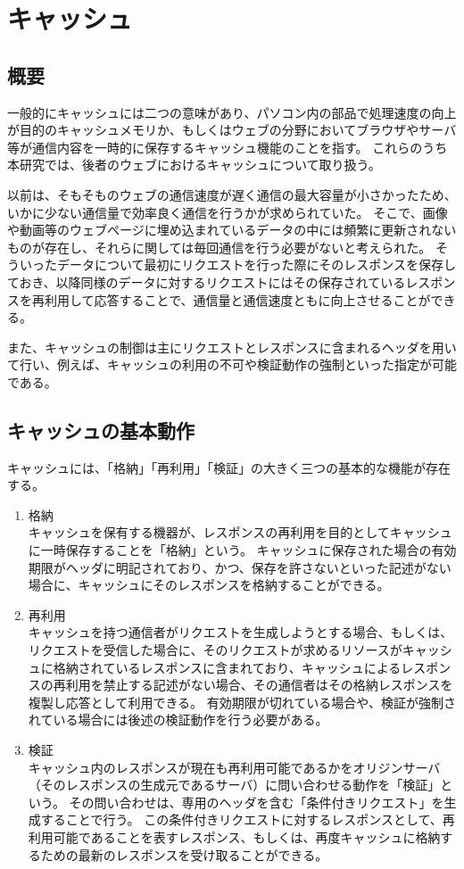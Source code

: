 \documentclass[12pt,a4paper]{jbook}
\begin{document}
\section{キャッシュ}
\subsection{概要}
一般的にキャッシュには二つの意味があり、パソコン内の部品で処理速度の向上が目的のキャッシュメモリか、もしくはウェブの分野においてブラウザやサーバ等が通信内容を一時的に保存するキャッシュ機能のことを指す。
これらのうち本研究では、後者のウェブにおけるキャッシュについて取り扱う。

以前は、そもそものウェブの通信速度が遅く通信の最大容量が小さかったため、いかに少ない通信量で効率良く通信を行うかが求められていた。
そこで、画像や動画等のウェブページに埋め込まれているデータの中には頻繁に更新されないものが存在し、それらに関しては毎回通信を行う必要がないと考えられた。
そういったデータについて最初にリクエストを行った際にそのレスポンスを保存しておき、以降同様のデータに対するリクエストにはその保存されているレスポンスを再利用して応答することで、通信量と通信速度ともに向上させることができる。

また、キャッシュの制御は主にリクエストとレスポンスに含まれるヘッダを用いて行い、例えば、キャッシュの利用の不可や検証動作の強制といった指定が可能である。

\subsection{キャッシュの基本動作}
キャッシュには、「格納」「再利用」「検証」の大きく三つの基本的な機能が存在する。

\begin{enumerate}
\item 格納\\
キャッシュを保有する機器が、レスポンスの再利用を目的としてキャッシュに一時保存することを「格納」という。
キャッシュに保存された場合の有効期限がヘッダに明記されており、かつ、保存を許さないといった記述がない場合に、キャッシュにそのレスポンスを格納することができる。
\item 再利用\\
キャッシュを持つ通信者がリクエストを生成しようとする場合、もしくは、リクエストを受信した場合に、そのリクエストが求めるリソースがキャッシュに格納されているレスポンスに含まれており、キャッシュによるレスポンスの再利用を禁止する記述がない場合、その通信者はその格納レスポンスを複製し応答として利用できる。
有効期限が切れている場合や、検証が強制されている場合には後述の検証動作を行う必要がある。
\item 検証\\
キャッシュ内のレスポンスが現在も再利用可能であるかをオリジンサーバ（そのレスポンスの生成元であるサーバ）に問い合わせる動作を「検証」という。
その問い合わせは、専用のヘッダを含む「条件付きリクエスト」を生成することで行う。
この条件付きリクエストに対するレスポンスとして、再利用可能であることを表すレスポンス、もしくは、再度キャッシュに格納するための最新のレスポンスを受け取ることができる。
\end{enumerate}
\end{document}
